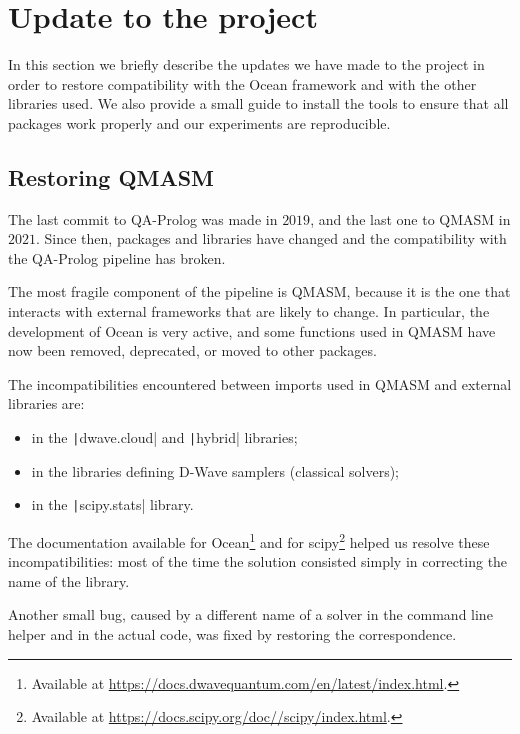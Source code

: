 {\section{Update to the project}
In this section we briefly describe the updates we have made to the project in order to restore compatibility with the Ocean framework and with the other libraries used. We also provide a small guide to install the tools to ensure that all packages work properly and our experiments are reproducible.
\subsection{Restoring QMASM}
The last commit to QA-Prolog was made in $2019$, and the last one to QMASM in $2021$. Since then, packages and libraries have changed and the compatibility with the QA-Prolog pipeline has broken.

The most fragile component of the pipeline is QMASM, because it is the one that interacts with external frameworks that are likely to change. In particular, the development of Ocean is very active, and some functions used in QMASM have now been removed, deprecated, or moved to other packages.

The incompatibilities encountered between imports used in QMASM and external libraries are:
\begin{itemize}
	\item in the \texttt|dwave.cloud| and \texttt|hybrid| libraries;
	\item in the libraries defining D-Wave samplers (classical solvers);
	\item in the \texttt|scipy.stats| library.
\end{itemize}
The documentation available for Ocean\footnote{Available at \url{https://docs.dwavequantum.com/en/latest/index.html}.} and for scipy\footnote{Available at \url{https://docs.scipy.org/doc//scipy/index.html}.} helped us resolve these incompatibilities: most of the time the solution consisted simply in correcting the name of the library.

Another small bug, caused by a different name of a solver in the command line helper and in the actual code, was fixed by restoring the correspondence.

}
